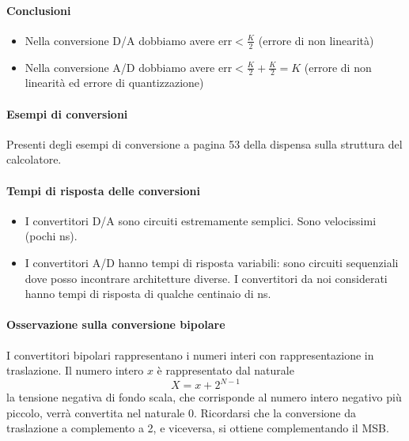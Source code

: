 \documentclass[11pt]{report}
\begin{document}
\paragraph{Conclusioni}
\begin{itemize}
\item Nella conversione D/A dobbiamo avere $\text{err} < \frac{K}{2}$ (errore di non linearità)
\item Nella conversione A/D dobbiamo avere $\text{err} < \frac{K}{2}+\frac{K}{2}=K$ (errore di non linearità ed errore di quantizzazione)
\end{itemize}
\paragraph{Esempi di conversioni} Presenti degli esempi di conversione a pagina 53 della dispensa sulla struttura del calcolatore.
\paragraph{Tempi di risposta delle conversioni}
\begin{itemize}
\item I convertitori D/A sono circuiti estremamente semplici. Sono velocissimi (pochi ns).
\item I convertitori A/D hanno tempi di risposta variabili: sono circuiti sequenziali dove posso incontrare architetture diverse. I convertitori da noi considerati hanno tempi di risposta di qualche centinaio di ns.
\end{itemize}
\paragraph{Osservazione sulla conversione bipolare} I convertitori bipolari rappresentano i numeri interi con rappresentazione in traslazione. Il numero intero $x$ è rappresentato dal naturale
\[X=x+2^{N-1}\]
la tensione negativa di fondo scala, che corrisponde al numero intero negativo più piccolo, verrà convertita nel naturale 0. Ricordarsi che la conversione da traslazione a complemento a 2, e viceversa, si ottiene complementando il MSB.
\end{document}
